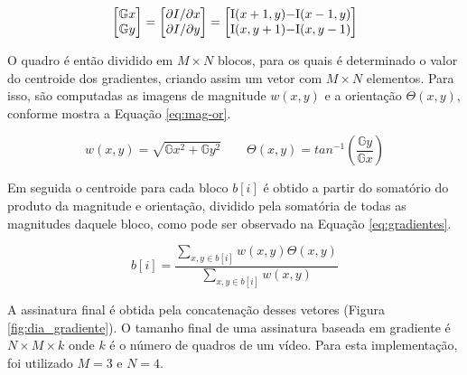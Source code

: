 \begin{equation}
  \label{eq:gmatrix}
  \begin{bmatrix}
    \mathbb{G}x
    \\ 
    \mathbb{G}y
  \end{bmatrix}= 
  \begin{bmatrix}
    \partial I/\partial x
    \\ 
    \partial I/\partial y
  \end{bmatrix}=
  \begin{bmatrix}
    $I$(x+1, y) - $I$(x-1,y)
    \\ 
    $I$(x, y+1) - $I$(x,y-1)
  \end{bmatrix}
\end{equation}
    
	O quadro é então dividido em $M\times N$ blocos, para os quais é determinado o valor do centroide dos gradientes, criando assim um vetor com $M \times N$ elementos. Para isso, são computadas as imagens de magnitude \textit{$w(x,y)$} e a orientação \textit{$\Theta(x,y)$}, conforme mostra a Equação \ref{eq:mag-or}.
    
\begin{equation}
	\label{eq:mag-or}
    w(x,y) = \sqrt{\mathbb{G}x^{2} + \mathbb{G}y^{2}}
\qquad
\Theta(x,y) = tan^{-1}\left (\frac{\mathbb{G}y}{\mathbb{G}x} \right)
\end{equation}
    
    Em seguida o centroide para cada bloco $b[i]$ é obtido a partir do somatório do produto da magnitude e orientação, dividido pela somatória de todas as magnitudes daquele bloco, como pode ser observado na Equação \ref{eq:gradientes}.
    
    
\begin{equation}
	\label{eq:gradientes}
	b[i] = \frac{\sum_{x,y \in b[i]} w(x,y)\Theta (x,y)}{\sum_{x,y \in b[i]} w(x,y)}
\end{equation}

A assinatura final é obtida pela concatenação desses vetores (Figura \ref{fig:dia_gradiente}). O tamanho final de uma assinatura baseada em gradiente é $N \times M \times k$ onde $k$ é o número de quadros de um vídeo. Para esta implementação, foi utilizado $M = 3$ e $N = 4$.  

